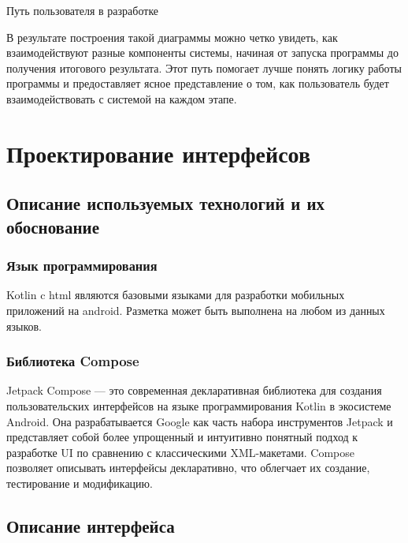 \begin{image}
	\caption{Путь пользователя в разработке}
	\label{fig:user:flow}
\end{image}

В результате построения такой диаграммы можно четко увидеть,
как взаимодействуют разные компоненты системы,
начиная от запуска программы до получения итогового результата.
Этот путь помогает лучше понять логику работы программы
и предоставляет ясное представление о том,
как пользователь будет взаимодействовать с системой на каждом этапе.

\section{Проектирование интерфейсов}

\subsection{Описание используемых технологий и их обоснование}

\subsubsection{Язык программирования}

Kotlin c html являются базовыми языками для разработки мобильных приложений на android.
Разметка может быть выполнена на любом из данных языков.

\subsubsection{Библиотека Compose}

Jetpack Compose — это современная декларативная библиотека для создания пользовательских интерфейсов на языке
программирования Kotlin в экосистеме Android.
Она разрабатывается Google как часть набора инструментов Jetpack и представляет собой более упрощенный и
интуитивно понятный подход к разработке UI по сравнению с классическими XML-макетами.
Compose позволяет описывать интерфейсы декларативно, что облегчает их создание, тестирование и модификацию.
\subsection{Описание интерфейса}

